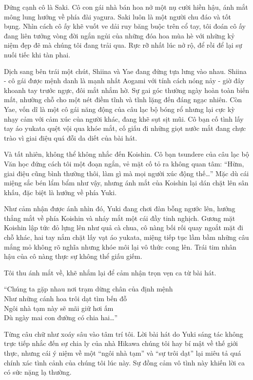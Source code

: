 \documentclass[../main.tex]{subfiles}
\begin{document}
Đứng cạnh cô là Saki. Cô con gái nhà bán hoa nở một nụ cười hiền hậu, ánh mắt mông lung hướng về phía đài yagura. Saki luôn là một người chu đáo và tốt bụng. Nhìn cách cô ấy khẽ vuốt ve dải ruy băng buộc trên cổ tay, tôi đoán cô ấy đang liên tưởng vòng đời ngắn ngủi của những đóa hoa mùa hè với những kỷ niệm đẹp đẽ mà chúng tôi đang trải qua. Rực rỡ nhất lúc nở rộ, để rồi để lại sự nuối tiếc khi tàn phai.

Dịch sang bên trái một chút, Shiina và Yae đang đứng tựa lưng vào nhau. Shiina - cô gái được mệnh danh là mạnh nhất Aogami với tính cách nóng nảy - giờ đây khoanh tay trước ngực, đôi mắt nhắm hờ. Sự gai góc thường ngày hoàn toàn biến mất, nhường chỗ cho một nét điềm tĩnh và tĩnh lặng đến đáng ngạc nhiên. Còn Yae, vốn dĩ là một cô gái năng động của câu lạc bộ bóng rổ nhưng lại cực kỳ nhạy cảm với cảm xúc của người khác, đang khẽ sụt sịt mũi. Cô bạn cố tình lấy tay áo yukata quệt vội qua khóe mắt, cố giấu đi những giọt nước mắt đang chực trào vì giai điệu quá đỗi da diết của bài hát.

Và tất nhiên, không thể không nhắc đến Koishin. Cô bạn tsundere của câu lạc bộ Văn học đứng cách tôi một đoạn ngắn, vẻ mặt cố tỏ ra không quan tâm: ``Hừm, giai điệu cũng bình thường thôi, làm gì mà mọi người xúc động thế\dots'' Mặc dù cái miệng sắc bén lẩm bẩm như vậy, nhưng ánh mắt của Koishin lại dán chặt lên sân khấu, đặc biệt là hướng về phía Yuki.

Như cảm nhận được ánh nhìn đó, Yuki đang chơi đàn bỗng ngước lên, hướng thẳng mắt về phía Koishin và nháy mắt một cái đầy tinh nghịch. Gương mặt Koishin lập tức đỏ lựng lên như quả cà chua, cô nàng bối rối quay ngoắt mặt đi chỗ khác, hai tay nắm chặt lấy vạt áo yukata, miệng tiếp tục lầm bầm những câu mắng mỏ không rõ nghĩa nhưng khóe môi lại vô thức cong lên. Trái tim nhân hậu của cô nàng thực sự không thể giấu giếm.

Tôi thu ánh mắt về, khẽ nhắm lại để cảm nhận trọn vẹn ca từ bài hát.

\begin{center}
  ``Chúng ta gặp nhau nơi trạm dừng chân của định mệnh\\
  Như những cánh hoa trôi dạt tìm bến đỗ\\
  Ngôi nhà tạm này sẽ mãi giữ hơi ấm\\
  Dù ngày mai con đường có chia hai\dots''
\end{center}        %

Từng câu chữ như xoáy sâu vào tâm trí tôi. Lời bài hát do Yuki sáng tác không trực tiếp nhắc đến sự chia ly của nhà Hikawa chúng tôi hay bí mật về thế giới thực, nhưng cái ý niệm về một ``ngôi nhà tạm'' và ``sự trôi dạt'' lại miêu tả quá chính xác tình cảnh của chúng tôi lúc này. Sự đồng cảm vô tình này khiến lời ca có sức nặng lạ thường.
\end{document}
